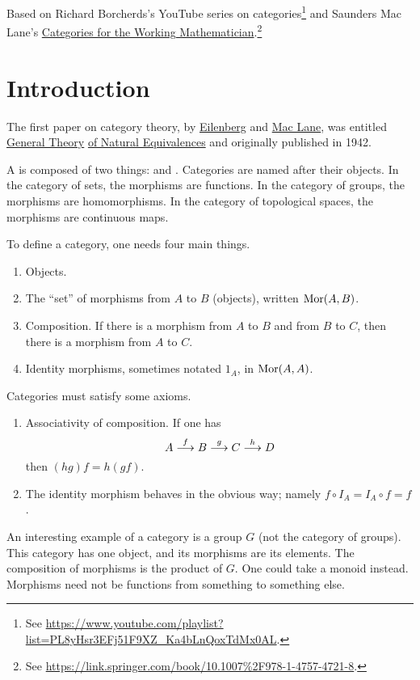 \documentclass[11pt, oneside]{article}
\begin{document}
\maketitle
Based on {Richard Borcherds's YouTube series on categories}\footnote{See \url{https://www.youtube.com/playlist?list=PL8yHsr3EFj51F9XZ\_Ka4bLnQoxTdMx0AL}.} and Saunders Mac Lane's {\underline{Categories for the Working Mathematician}}.\footnote{See \url{https://link.springer.com/book/10.1007\%2F978-1-4757-4721-8}.} \color{black}\cite{CWM}
\tableofcontents
\section{Introduction}
The first paper on category theory, by \href{https://en.wikipedia.org/wiki/Samuel_Eilenberg}{\color{black}Eilenberg} and \href{https://en.wikipedia.org/wiki/Saunders_Mac_Lane}{\color{black}Mac Lane}, was entitled \underline{General Theory}  \underline{of Natural Equivalences} and originally published in 1942.

A \href{https://en.wikipedia.org/wiki/Category_(mathematics)}{} is composed of two things:  and . {Categories} are named after their objects. In the category of sets, the morphisms are functions. In the category of groups, the morphisms are homomorphisms. In the category of topological spaces, the morphisms are continuous maps.

To define a category, one needs four main things. 
\begin{enumerate}
\item Objects.
\item The ``set'' of morphisms from $A$ to $B$ (objects), written $\operatorname{Mor}( A, B)$.
\item Composition. If there is a morphism from $ A$ to $ B$ and from $ B$ to $ C$, then there is a morphism from $ A$ to $ C$.
\item Identity morphisms, sometimes notated $1_{ A}$, in $\operatorname{Mor}( A, A)$.
\end{enumerate}
Categories must satisfy some axioms.
\begin{enumerate}
\item Associativity of composition. If one has 
$$
 A \overset {f} {\longrightarrow}  B\overset {g} {\longrightarrow}  C \overset {h} {\longrightarrow}  D
$$
then $(hg)f = h(gf)$.
\item The identity morphism behaves in the obvious way; namely $f\circ I_{ A} = I_{ A} \circ f = f$.
\end{enumerate}
An interesting example of a category is a group $G$ (not the category of groups). This category has one object, and its morphisms are its elements. The composition of morphisms is the product of $G$. One could take a monoid instead. Morphisms need not be functions from something to something else.
\end{document}
